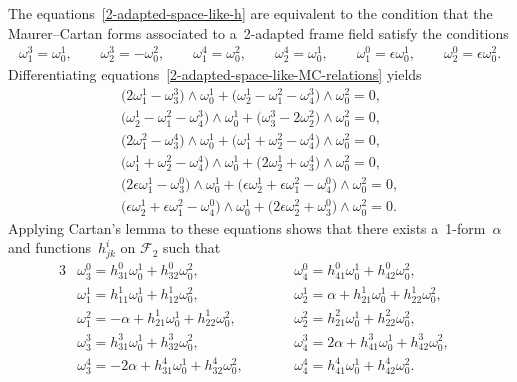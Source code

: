 \documentclass[pdftex]{sigma}
\numberwithin{equation}{section}
\theoremstyle{definition}
\begin{document}
The equations~\eqref{2-adapted-space-like-h} are equivalent to the condition that the Maurer--Cartan forms associated to
a~2-adapted frame f\/ield satisfy the conditions
\begin{gather}
\omega^3_1= \omega^1_0,
\qquad
\omega^3_2=-\omega^2_0,
\qquad
\omega^4_1=\omega^2_0,
\qquad
\omega^4_2=\omega^1_0,
\qquad
\omega^0_1=\epsilon  \omega^1_0,
\qquad
\omega^0_2=\epsilon  \omega^2_0.
\label{2-adapted-space-like-MC-relations}
\end{gather}
Dif\/ferentiating equations~\eqref{2-adapted-space-like-MC-relations} yields
\begin{gather*}
\big(2\omega^1_1 - \omega^3_3\big) \wedge \omega^1_0 + \big(\omega^1_2 - \omega^2_1 - \omega^3_4\big) \wedge \omega^2_0 = 0,
\\
\big(\omega^1_2 - \omega^2_1 - \omega^3_4\big) \wedge \omega^1_0 + \big(\omega^3_3 - 2\omega^2_2\big) \wedge \omega^2_0 = 0,
\\
\big(2\omega^2_1 - \omega^4_3\big) \wedge \omega^1_0 + \big(\omega^1_1 + \omega^2_2 - \omega^4_4\big) \wedge \omega^2_0 = 0,
\\
\big(\omega^1_1 + \omega^2_2 - \omega^4_4\big) \wedge \omega^1_0 + \big(2\omega^1_2 + \omega^4_3\big) \wedge \omega^2_0 = 0,
\\
\big(2\epsilon\omega^1_1 - \omega^0_3\big) \wedge \omega^1_0 + \big(\epsilon\omega^1_2 + \epsilon\omega^2_1 - \omega^0_4\big)
\wedge \omega^2_0 = 0,
\\
\big(\epsilon\omega^1_2 + \epsilon\omega^2_1 - \omega^0_4\big) \wedge \omega^1_0 + \big(2\epsilon\omega^2_2 + \omega^0_3\big)
\wedge \omega^2_0 = 0.
\end{gather*}
Applying Cartan's lemma to these equations shows that there exists a~1-form~$\alpha$ and func\-tions~$h^i_{jk}$ on
$\mathcal{F}_2$ such that
\begin{alignat}{3}
& \omega^0_3=h^0_{31}\omega^1_0 + h^0_{32}\omega^2_0,
\qquad&&
\omega^0_4=h^0_{41}\omega^1_0 + h^0_{42}\omega^2_0,&
\nonumber
\\
&\omega^1_1=h^1_{11}\omega^1_0 + h^1_{12}\omega^2_0,
\qquad&&
\omega^1_2=\alpha + h^1_{21}\omega^1_0 + h^1_{22}\omega^2_0,&
\nonumber
\\
&\omega^2_1=-\alpha + h^1_{21}\omega^1_0 + h^1_{22}\omega^2_0,
\qquad&&
\omega^2_2=h^2_{21}\omega^1_0 + h^2_{22}\omega^2_0,&
\nonumber
\\
&\omega^3_3=h^3_{31}\omega^1_0 + h^3_{32}\omega^2_0,
\qquad&&
\omega^3_4=2\alpha + h^3_{41}\omega^1_0 + h^3_{42}\omega^2_0,&
\nonumber
\\
&\omega^4_3=-2\alpha + h^4_{31}\omega^1_0 + h^4_{32}\omega^2_0,
\qquad&&
\omega^4_4=h^4_{41}\omega^1_0 + h^4_{42}\omega^2_0.&
\label{2-adapted-space-like-MC-semi-basic-forms}
\end{alignat}
\end{document}
